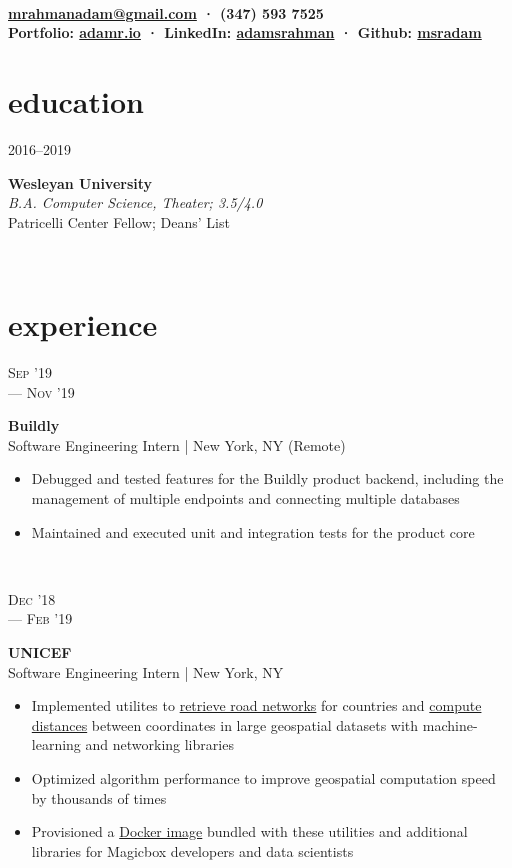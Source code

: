 \documentclass[letterpaper, 10.5pt]{article}
\author{Adam Rahman}
\makeatletter
\renewcommand{\maketitle}{
	\hspace{.125\textwidth}
	\begin{minipage}[t]{.75\textwidth}
    \begin{center}
        \fontsize{16pt}{15pt}\selectfont\bfseries \theauthor \\
        \fontsize{10pt}{15pt}\selectfont\sf
        \href{mailto:mrahmanadam@gmail.com}{mrahmanadam@gmail.com} · (347) 593 7525 \\
        Portfolio: \href{http://adamr.io}{adamr.io} · 
        LinkedIn: \href{https://www.linkedin.com/in/adamsrahman/}{adamsrahman} · 
        Github: \href{https://github.com/msradam}{msradam}  \\ 
        \end{center}
    \end{minipage}}
\newcommand{\eduentry}[4]{
    \begin{minipage}[t]{.15\linewidth}
    \hfill \textsc{#1}
    \end{minipage}
    \hfill\vline\hfill
    \begin{minipage}[t]{.80\linewidth}
    {\bf\large#2}
    \vspace{1pt}
    \\\textit{#3} \small{#4}
    \end{minipage}\\
    \vspace{.125cm}
    }
\newcommand{\expentry}[5]{
    \begin{minipage}[t]{.15\linewidth}
    \hfill \textsc{#1} \\
    \hfill \hspace*{5pt}\hfill --- \textsc{#2}
    \end{minipage}
    \hfill\vline\hfill
    \begin{minipage}[t]{.80\linewidth}
    {\bf\large#3}
    \\ #4 
    \vspace{-1.5mm}
    \small{#5}
    \end{minipage}\\
    \vspace{.125cm}
    }
\makeatother
\begin{document}
    \maketitle
    \vspace{.125cm}


    \section{education}
    \eduentry{2016--2019}
    {Wesleyan University}
    {B.A. Computer Science, Theater; 3.5/4.0}
    {\\ Patricelli Center Fellow; Deans' List}

    \section{experience}
    \expentry{Sep '19}
    {Nov '19}
    {Buildly}
    {Software Engineering Intern | New York, NY (Remote)}
    {

        \begin{itemize}{\leftmargin=0.5em \itemindent=0em}
          \setlength\itemsep{0.1mm}
          \item Debugged and tested features for the Buildly product backend, including the management of multiple endpoints and connecting multiple databases
          \item Maintained and executed unit and integration tests for the product core 
        \end{itemize}
        
    }

    \expentry{Dec '18}
    {Feb '19}
    {UNICEF}
    {Software Engineering Intern | New York, NY}
    {

        \begin{itemize}{\leftmargin=0.5em \itemindent=0em}
          \setlength\itemsep{0.1mm}
          \item Implemented utilites to \href{https://github.com/unicef/magicbox-download-roads}{retrieve road networks} for countries and \href{https://github.com/msradam/magicbox-site-routing}{compute distances} between coordinates in large geospatial datasets with machine-learning and networking libraries
          \item Optimized algorithm performance to improve geospatial computation speed by thousands of times 
          \item Provisioned a \href{https://hub.docker.com/r/msradam/magicbox-tools}{Docker image} bundled with these utilities and additional libraries for Magicbox developers and data scientists
        \end{itemize}
        
    }
\end{document}
